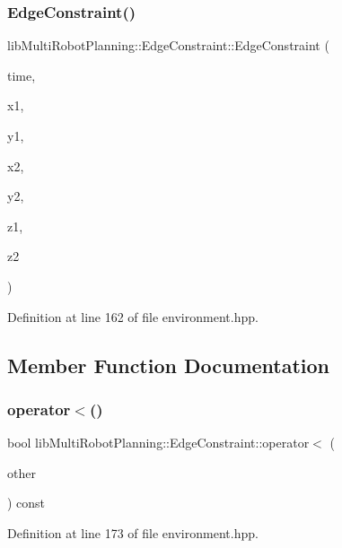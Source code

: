 \subsubsection{\texorpdfstring{Edge\+Constraint()}{EdgeConstraint()}}
{\footnotesize\ttfamily lib\+Multi\+Robot\+Planning\+::\+Edge\+Constraint\+::\+Edge\+Constraint (\begin{DoxyParamCaption}\item[{int}]{time,  }\item[{int}]{x1,  }\item[{int}]{y1,  }\item[{int}]{x2,  }\item[{int}]{y2,  }\item[{int}]{z1,  }\item[{int}]{z2 }\end{DoxyParamCaption})\hspace{0.3cm}{\ttfamily [inline]}}



Definition at line 162 of file environment.\+hpp.



\subsection{Member Function Documentation}
\mbox{\label{structlib_multi_robot_planning_1_1_edge_constraint_a24d986f0dc3c7d2f3d962504b1be2aae}} 
\subsubsection{\texorpdfstring{operator$<$()}{operator<()}}
{\footnotesize\ttfamily bool lib\+Multi\+Robot\+Planning\+::\+Edge\+Constraint\+::operator$<$ (\begin{DoxyParamCaption}\item[{const \hyperlink{structlib_multi_robot_planning_1_1_edge_constraint}{Edge\+Constraint} \&}]{other }\end{DoxyParamCaption}) const\hspace{0.3cm}{\ttfamily [inline]}}



Definition at line 173 of file environment.\+hpp.

